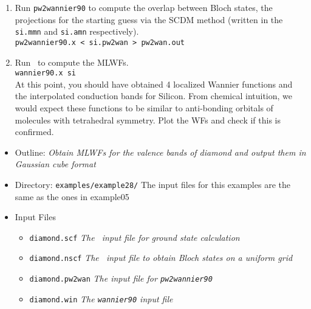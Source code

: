 \documentclass[a4paper,11pt,twoside]{article}
\begin{document}
\begin{itemize}
\begin{enumerate}
    \item Run {\tt pw2wannier90} to compute the overlap between Bloch
    states, the projections for the starting guess via the SCDM method (written in the
    {\tt si.mmn} and {\tt si.amn} respectively).\\  
    {\tt pw2wannier90.x < si.pw2wan > pw2wan.out}

    \item Run \wannier\ to compute the MLWFs.\\
    {\tt wannier90.x si}\\
    At this point, you should have obtained 4 localized Wannier functions and the interpolated conduction bands for Silicon. From chemical intuition, we would expect these functions to be similar to anti-bonding orbitals of molecules with tetrahedral symmetry. Plot the WFs and check if this is confirmed. 
  \end{enumerate}
\end{itemize}

\begin{itemize}
\item{Outline: \it{Obtain MLWFs for the valence bands of diamond and output them in Gaussian cube format}}
\item{Directory: {\tt examples/example28/}}
The input files for this examples are the same as the ones in example05
\item{Input Files}
\begin{itemize}
\item{ {\tt diamond.scf}  {\it The \pwscf\ input file for ground state
    calculation}} 
\item{ {\tt diamond.nscf}  {\it The \pwscf\ input file to obtain Bloch
    states on a uniform grid}} 
\item{ {\tt diamond.pw2wan}  {\it The input file for {\tt pw2wannier90}}}
\item{ {\tt diamond.win}  {\it The {\tt wannier90} input file}}
\end{itemize}
\end{itemize}
\end{document}
